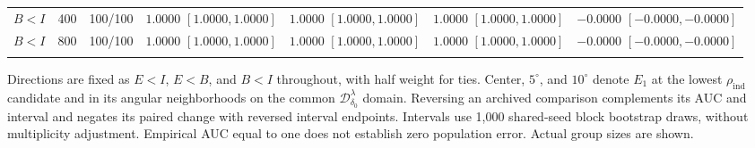 \documentclass[12pt,letterpaper]{article}
\theoremstyle{plain}
\theoremstyle{definition}
\begin{document}
\begin{table}[p]
\begin{adjustbox}{max width=\linewidth}
\begin{tabular}{lrccccc}
$B<I$ & 400 & 100/100 & \shortstack{$1.0000$\\{\scriptsize$[1.0000,1.0000]$}} & \shortstack{$1.0000$\\{\scriptsize$[1.0000,1.0000]$}} & \shortstack{$1.0000$\\{\scriptsize$[1.0000,1.0000]$}} & \shortstack{$-0.0000$\\{\scriptsize$[-0.0000,-0.0000]$}}\\
$B<I$ & 800 & 100/100 & \shortstack{$1.0000$\\{\scriptsize$[1.0000,1.0000]$}} & \shortstack{$1.0000$\\{\scriptsize$[1.0000,1.0000]$}} & \shortstack{$1.0000$\\{\scriptsize$[1.0000,1.0000]$}} & \shortstack{$-0.0000$\\{\scriptsize$[-0.0000,-0.0000]$}}\\
\addlinespace
\bottomrule
\end{tabular}
\end{adjustbox}
\par\smallskip
\begin{minipage}{0.98\linewidth}\footnotesize
Directions are fixed as $E<I$, $E<B$, and $B<I$ throughout, with half weight for ties. Center, $5^\circ$, and $10^\circ$ denote $E_1$ at the lowest $\rho_{\mathrm{ind}}$ candidate and in its angular neighborhoods on the common $\mathcal D^\lambda_{\delta_0}$ domain. Reversing an archived comparison complements its AUC and interval and negates its paired change with reversed interval endpoints. Intervals use 1,000 shared-seed block bootstrap draws, without multiplicity adjustment. Empirical AUC equal to one does not establish zero population error. Actual group sizes are shown.
\end{minipage}
\endgroup
\end{table}
\clearpage
\end{document}
